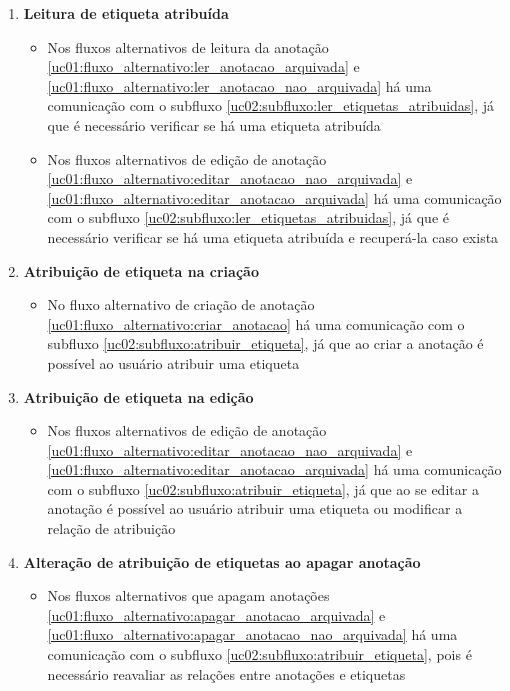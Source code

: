 \documentclass[
	12pt,				%
	oneside,			%
	a4paper,			%
	english,			%
	brazil,				%
	]{abntex2}
\begin{document}
\begin{enumerate}[label=\textbf{UC01-PE{\arabic*}},font=\normalsize]
    \item \textbf{\normalsize Leitura de etiqueta atribuída} \label{uc01:ponto_extensao:ler_etiqueta}
    \begin{itemize}
        \item Nos fluxos alternativos de leitura da anotação \ref{uc01:fluxo_alternativo:ler_anotacao_arquivada} e \ref{uc01:fluxo_alternativo:ler_anotacao_nao_arquivada} há uma comunicação com o subfluxo \ref{uc02:subfluxo:ler_etiquetas_atribuidas}, já que é necessário verificar se há uma etiqueta atribuída
        \item Nos fluxos alternativos de edição de anotação \ref{uc01:fluxo_alternativo:editar_anotacao_nao_arquivada} e \ref{uc01:fluxo_alternativo:editar_anotacao_arquivada} há uma comunicação com o subfluxo \ref{uc02:subfluxo:ler_etiquetas_atribuidas}, já que é necessário verificar se há uma etiqueta atribuída e recuperá-la caso exista
    \end{itemize}
    
    \item \textbf{\normalsize Atribuição de etiqueta na criação} \label{uc01:ponto_extensao:atribuir_criar}
    \begin{itemize}
        \item No fluxo alternativo de criação de anotação \ref{uc01:fluxo_alternativo:criar_anotacao} há uma comunicação com o subfluxo \ref{uc02:subfluxo:atribuir_etiqueta}, já que ao criar a anotação é possível ao usuário atribuir uma etiqueta
    \end{itemize}

    \item \textbf{\normalsize Atribuição de etiqueta na edição} \label{uc01:ponto_extensao:atribuir_editar}
    \begin{itemize}
        \item Nos fluxos alternativos de edição de anotação \ref{uc01:fluxo_alternativo:editar_anotacao_nao_arquivada} e \ref{uc01:fluxo_alternativo:editar_anotacao_arquivada} há uma comunicação com o subfluxo \ref{uc02:subfluxo:atribuir_etiqueta}, já que ao se editar a anotação é possível ao usuário atribuir uma etiqueta ou modificar a relação de atribuição
    \end{itemize}
    
    \item \textbf{\normalsize Alteração de atribuição de etiquetas ao apagar anotação}
    \label{uc01:ponto_extensao:alterar_atribuicao}
    \begin{itemize}
        \item Nos fluxos alternativos que apagam anotações \ref{uc01:fluxo_alternativo:apagar_anotacao_arquivada} e \ref{uc01:fluxo_alternativo:apagar_anotacao_nao_arquivada} há uma comunicação com o subfluxo \ref{uc02:subfluxo:atribuir_etiqueta}, pois é necessário reavaliar as relações entre anotações e etiquetas
    \end{itemize}
\end{enumerate}
\end{document}
